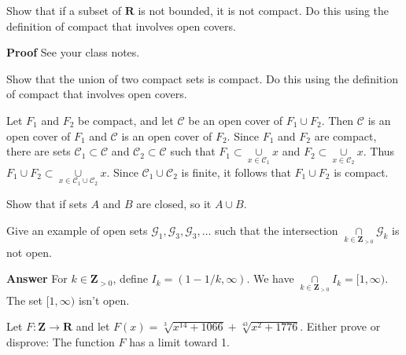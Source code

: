 \documentclass[12pt,fleqn]{exam}
\newcommand{\reals}{\mathbf{R}}
\begin{document}
\begin{questions}
\question   Show that if a subset of \(\reals\) is not bounded, it
is not compact. Do this using the definition of compact that involves
open covers.

\begin{solution}
\textbf{Proof} See your class notes.
\end{solution}






\question   Show that the union of two compact sets is compact.  Do
this using  the definition of compact that involves
open covers.

\begin{solution}
 Let \(F_1\) and \(F_2\) be compact, and let
\(\mathcal{C}\) be an open cover of \(F_1 \cup  F_2\). Then
\(\mathcal{C}\) is an open cover of \(F_1\) and \(\mathcal{C}\) is an
open cover of \(F_2\). Since \(F_1\) and \(F_2\) are compact,
there are sets \(\mathcal{C}_1 \subset \mathcal{C}\) and
\(\mathcal{C}_2 \subset \mathcal{C}\) such that 
\(
  F_1 \subset \underset{x \in \mathcal{C}_1}{\cup} x\) and
\(
  F_2 \subset \underset{x \in \mathcal{C}_2}{\cup} x.
\)
Thus
\(\displaystyle
   F_1 \cup  F_2  \subset \underset{x \in \mathcal{C}_1 \cup \mathcal{C}_2 }{\cup} x
\).
Since \(\mathcal{C}_1 \cup \mathcal{C}_2\) is finite, it follows that 
\( F_1 \cup  F_2 \) is compact.

\end{solution}

\question Show that if sets $A$ and $B$ are closed, so it $A \cup B$.

\question   Give an example of open sets \(\mathcal{G}_1,
\mathcal{G}_3, \mathcal{G}_3, \dots \) such that the intersection
\( \displaystyle
  \underset{k \in \mathbf{Z}_{> 0}}{\cap} \mathcal{G}_k
\)
is not open.

\begin{solution}
\textbf{Answer} For \(k \in \mathbf{Z}_{>0}\), define \(I_k = (1-1/k,
\infty)\). We have
\(\displaystyle
  \underset{k \in \mathbf{Z}_{>0}}{\cap} I_k = [1,\infty).
\)
The set \([1,\infty)\) isn't open.

\end{solution}

\question   Let \(F : \mathbf{Z} \to \mathbf{R}\) and let
\( \displaystyle
  F(x) = \sqrt[3]{x^{14} + 1066} + \sqrt[43]{x^2 + 1776}.
\)
Either prove or disprove: 
  The function \(F\) has a limit toward 1.


\end{questions}
\end{document}
